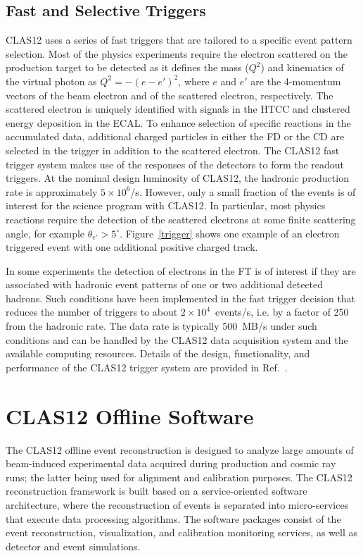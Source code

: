 \documentclass[final,3p,twocolumn]{elsarticle}
\begin{document}
\subsection{Fast and Selective Triggers} 

CLAS12 uses a series of fast triggers that are tailored to a specific event pattern selection. Most of the physics
experiments require the electron scattered on the production target to be detected as it defines the mass
($Q^2$) and kinematics of the virtual photon as $Q^2 = -(e - e')^2$, where $e$ and $e'$ are the 4-momentum
vectors of the beam electron and of the scattered electron, respectively. The scattered electron is uniquely identified with
signals in the HTCC and clustered energy deposition in the ECAL. To enhance selection of specific reactions in the
accumulated data, additional charged particles in either the FD or the CD are selected in the trigger in addition to
the scattered electron. The CLAS12 fast trigger system makes use of the responses of the detectors to form the
readout triggers. At the nominal design luminosity of CLAS12, the hadronic production rate is approximately
$5 \times 10^6$/s. However, only a small fraction of the events is of interest for the science program with
CLAS12. In particular, most physics reactions require the detection of the scattered electrons at some finite
scattering angle, for example $\theta_{e'} > 5^\circ$.  Figure~\ref{trigger} shows one example of an electron
triggered event with one additional positive charged track.   
   
In some experiments the detection of electrons in the FT is of interest if they are associated with hadronic
event patterns of one or two additional detected hadrons. Such conditions have been implemented in the fast trigger
decision that reduces the number of triggers to about $2 \times 10^4$~events/s, i.e. by  a factor of 250 from the
hadronic rate. The data rate is typically 500~MB/s under such conditions and can be handled by the CLAS12 data
acquisition system and the available computing resources. Details of the design, functionality, and performance of
the CLAS12 trigger system are provided in Ref.~\cite{TRIG}. 


\section{CLAS12 Offline Software}  

The CLAS12 offline event reconstruction is designed to analyze large amounts of beam-induced experimental data
acquired during production and cosmic ray runs; the latter being used for alignment and calibration purposes. The
CLAS12 reconstruction framework is built based on a service-oriented software architecture, where the
reconstruction of events is separated into micro-services that execute data processing algorithms. The software
packages consist of the event reconstruction, visualization, and calibration monitoring services, as well as detector
and event simulations. 
\end{document}
